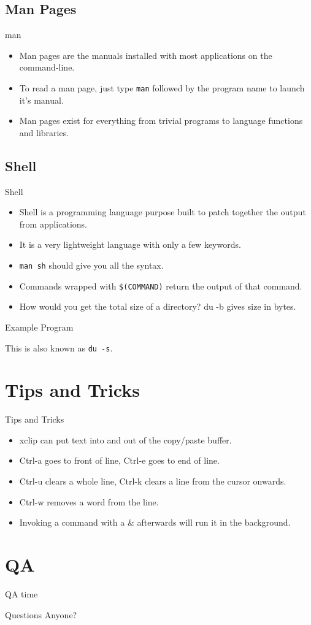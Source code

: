 \documentclass[10pt]{beamer}
\begin{document}
\subsection{Man Pages}
\begin{frame}{man}
\begin{itemize}[<+->]
\item Man pages are the manuals installed with most applications on the command-line.
\item To read a man page, just type \texttt{\color{blue}man} followed by the program name to launch it's manual.
\item Man pages exist for everything from trivial programs to language functions and libraries.
\end{itemize}
\end{frame}

\subsection{Shell}
\begin{frame}{Shell}
\begin{itemize}[<+->]
\item Shell is a programming language purpose built to patch together the output from applications.
\item It is a very lightweight language with only a few keywords.
\item \texttt{\color{blue}man sh} should give you all the syntax.
\item Commands wrapped with \texttt{\$(COMMAND)} return the output of that command.
\item How would you get the total size of a directory? \tiny{du -b gives size in bytes}.
\end{itemize}
\end{frame}

\begin{frame}{Example Program}

This is also known as \texttt{\color{blue}du -s}.
\end{frame}

\section{Tips and Tricks}
\begin{frame}{Tips and Tricks}
\begin{itemize}
\item xclip can put text into and out of the copy/paste buffer.
\item Ctrl-a goes to front of line, Ctrl-e goes to end of line.
\item Ctrl-u clears a whole line, Ctrl-k clears a line from the cursor onwards.
\item Ctrl-w removes a word from the line.
\item Invoking a command with a \& afterwards will run it in the background.
\end{itemize}
\end{frame}

\section{QA}
\begin{frame}{QA time}
  \begin{center}
    Questions Anyone?
  \end{center}
\end{frame}
\end{document}
